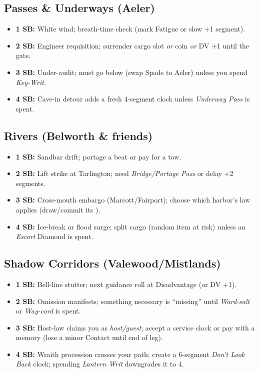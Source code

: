 \subsection{Passes \& Underways (Aeler)}
\begin{itemize}
  \item \textbf{1 SB:} White wind; breath-time check (mark Fatigue or slow +1 segment).
  \item \textbf{2 SB:} Engineer requisition; surrender cargo slot \emph{or} coin \emph{or} DV +1 until the gate.
  \item \textbf{3 SB:} Under-audit; must go below (swap Spade to Aeler) unless you spend \emph{Key-Writ}.
  \item \textbf{4 SB:} Cave-in detour adds a fresh 4-segment clock unless \emph{Underway Pass} is spent.
\end{itemize}

\subsection{Rivers (Belworth \& friends)}
\begin{itemize}
  \item \textbf{1 SB:} Sandbar drift; portage a beat or pay for a tow.
  \item \textbf{2 SB:} Lift strike at Tarlington; need \emph{Bridge/Portage Pass} or delay +2 segments.
  \item \textbf{3 SB:} Cross-mouth embargo (Marcott/Fairport); choose which harbor's law applies (draw/commit its \SuitDiamond{}).
  \item \textbf{4 SB:} Ice-break or flood surge; split cargo (random item at risk) unless an \emph{Escort} Diamond is spent.
\end{itemize}

\subsection{Shadow Corridors (Valewood/Mistlands)}
\begin{itemize}
  \item \textbf{1 SB:} Bell-line stutter; next guidance roll at Disadvantage (or DV +1).
  \item \textbf{2 SB:} Omission manifests; something necessary is ``missing'' until \emph{Ward-salt} or \emph{Way-cord} is spent.
  \item \textbf{3 SB:} Host-law claims you as \emph{host/guest}; accept a service clock or pay with a memory (lose a minor Contact until end of leg).
  \item \textbf{4 SB:} Wraith procession crosses your path; create a 6-segment \emph{Don't Look Back} clock; spending \emph{Lantern Writ} downgrades it to 4.
\end{itemize}

